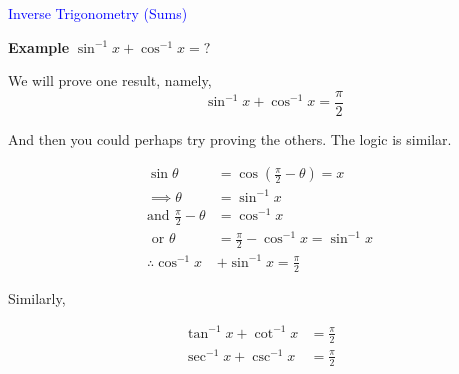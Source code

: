 \documentclass[14pt,fleqn]{extarticle}
\begin{document}
 

\begin{skill}
\begin{narrow}
\textcolor{blue}{Inverse Trigonometry (Sums)}

\small{\textbf{Example} } $\sin^{-1}x + \cos^{-1} x = ?$ 
\end{narrow}

\reason 

We will prove one result, namely, 
\[ \qquad \sin^{-1} x + \cos^{-1} x = \frac\pi{2} \]

And then you could perhaps try proving the others. The logic is similar. 


\begin{align}
\sin\theta &= \cos\left( \frac\pi{2} - \theta \right) = x \\
\implies \theta &= \sin^{-1} x \\
\text{and } \frac\pi{2} - \theta &= \cos^{-1} x \\
\text{ or } \theta &= \frac\pi{2} - \cos^{-1}x = \sin^{-1} x \\
\therefore \cos^{-1}x &+ \sin^{-1}x = \frac\pi{2}  
\end{align}

Similarly, 

%
\begin{align}
\tan^{-1}x + \cot^{-1}x &= \frac\pi{2} \\ 
\sec^{-1} x + \csc^{-1} x &= \frac\pi{2} 
\end{align}
\end{skill}
\end{document}
